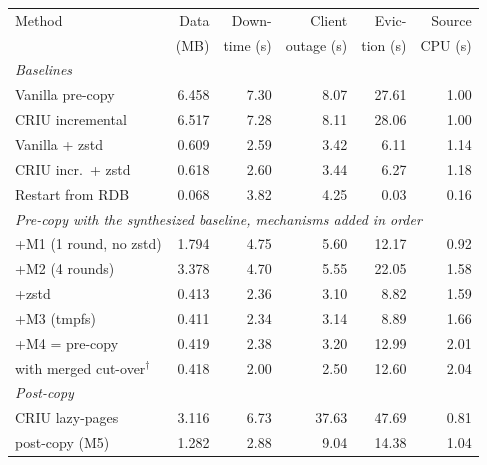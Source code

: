 \begin{tabular}{lrrrrr}
\toprule
Method & Data & Down- & Client & Evic- & Source \\
 & (MB) & time (s) & outage (s) & tion (s) & CPU (s) \\
\midrule
\multicolumn{6}{l}{\emph{Baselines}} \\
Vanilla pre-copy & 6.458 & 7.30 & 8.07 & 27.61 & 1.00 \\
CRIU incremental & 6.517 & 7.28 & 8.11 & 28.06 & 1.00 \\
Vanilla + zstd & 0.609 & 2.59 & 3.42 & 6.11 & 1.14 \\
CRIU incr.\ + zstd & 0.618 & 2.60 & 3.44 & 6.27 & 1.18 \\
Restart from RDB & 0.068 & 3.82 & 4.25 & 0.03 & 0.16 \\
\midrule
\multicolumn{6}{l}{\emph{Pre-copy with the synthesized baseline, mechanisms added in order}} \\
+M1 (1 round, no zstd) & 1.794 & 4.75 & 5.60 & 12.17 & 0.92 \\
+M2 (4 rounds) & 3.378 & 4.70 & 5.55 & 22.05 & 1.58 \\
+zstd & 0.413 & 2.36 & 3.10 & 8.82 & 1.59 \\
+M3 (tmpfs) & 0.411 & 2.34 & 3.14 & 8.89 & 1.66 \\
+M4 = \spod{} pre-copy & 0.419 & 2.38 & 3.20 & 12.99 & 2.01 \\
\quad with merged cut-over$^\dagger$ & 0.418 & 2.00 & 2.50 & 12.60 & 2.04 \\
\midrule
\multicolumn{6}{l}{\emph{Post-copy}} \\
CRIU lazy-pages & 3.116 & 6.73 & 37.63 & 47.69 & 0.81 \\
\spod{} post-copy (M5) & 1.282 & 2.88 & 9.04 & 14.38 & 1.04 \\
\bottomrule
\end{tabular}
